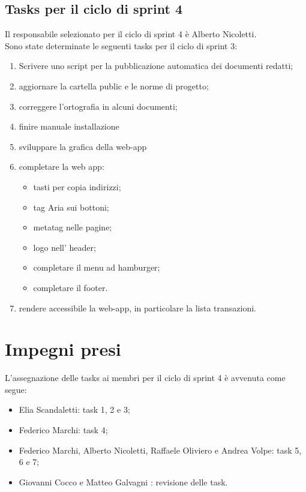\documentclass[a4paper, 12pt]{article}
\begin{document}
\subsection{Tasks per il ciclo di sprint 4}
Il responsabile selezionato per il ciclo di sprint 4 è Alberto Nicoletti. \\
Sono state determinate le seguenti tasks per il ciclo di sprint 3:
\begin{enumerate}
    \item Scrivere uno script per la pubblicazione automatica dei documenti redatti;
    \item aggiornare la cartella public e le norme di progetto;
    \item correggere l'ortografia in alcuni documenti;
	\item finire manuale installazione
	\item sviluppare la grafica della web-app
	\item completare la web app:
	    \begin{itemize}
	        \item tasti per copia indirizzi;
            \item tag Aria sui bottoni;
            \item metatag nelle pagine;
            \item logo nell' header;
            \item completare il menu ad hamburger;
            \item completare il footer.
	    \end{itemize}
	\item rendere accessibile la web-app, in particolare la lista transazioni.
\end{enumerate}

\section{Impegni presi}
L'assegnazione delle tasks ai membri per il ciclo di sprint 4 è avvenuta come segue:
\begin{itemize}
	\item Elia Scandaletti: task 1, 2 e 3;
	\item Federico Marchi: task 4;
	\item Federico Marchi, Alberto Nicoletti, Raffaele Oliviero e Andrea Volpe: task 5, 6 e 7;
	\item Giovanni Cocco e Matteo Galvagni : revisione delle task.
\end{itemize}
\end{document}
